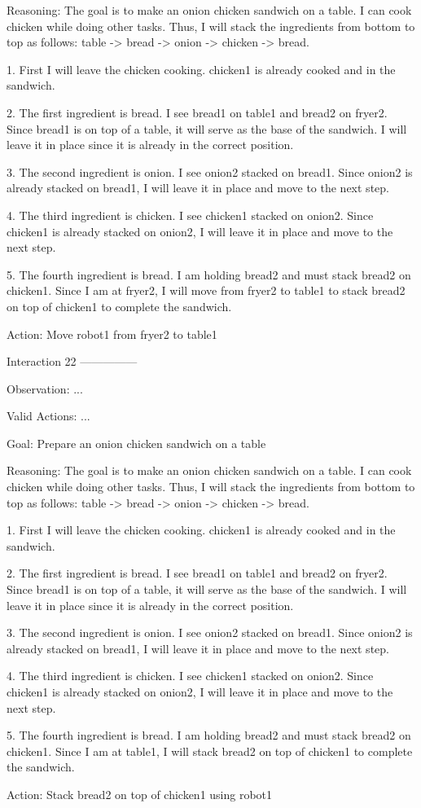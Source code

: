 Reasoning: The goal is to make an onion chicken sandwich on a table. I can cook chicken while doing other tasks. Thus, I
will stack the ingredients from bottom to top as follows: table -> bread -> onion -> chicken -> bread.

1. First I will leave the chicken cooking. chicken1 is already cooked and in the sandwich.

2. The first ingredient is bread. I see bread1 on table1 and bread2 on fryer2. Since bread1 is on top of a table, it will serve as the base of the sandwich. I will leave it in place since it is already in the correct position.

3. The second ingredient is onion. I see onion2 stacked on bread1. Since onion2 is already stacked on bread1, I will leave it in place and move to the next step.

4. The third ingredient is chicken. I see chicken1 stacked on onion2. Since chicken1 is already stacked on onion2, I will leave it in place and move to the next step.

5. The fourth ingredient is bread. I am holding bread2 and must stack bread2 on chicken1. Since I am at fryer2, I will move from fryer2 to table1 to stack bread2 on top of chicken1 to complete the sandwich.

Action: Move robot1 from fryer2 to table1


Interaction 22
---------------


Observation: ...

Valid Actions: ...

Goal: Prepare an onion chicken sandwich on a table


Reasoning: The goal is to make an onion chicken sandwich on a table. I can cook chicken while doing other tasks. Thus, I
will stack the ingredients from bottom to top as follows: table -> bread -> onion -> chicken -> bread.

1. First I will leave the chicken cooking. chicken1 is already cooked and in the sandwich.

2. The first ingredient is bread. I see bread1 on table1 and bread2 on fryer2. Since bread1 is on top of a table, it will serve as the base of the sandwich. I will leave it in place since it is already in the correct position.

3. The second ingredient is onion. I see onion2 stacked on bread1. Since onion2 is already stacked on bread1, I will leave it in place and move to the next step.

4. The third ingredient is chicken. I see chicken1 stacked on onion2. Since chicken1 is already stacked on onion2, I will leave it in place and move to the next step.

5. The fourth ingredient is bread. I am holding bread2 and must stack bread2 on chicken1. Since I am at table1, I will stack bread2 on top of chicken1 to complete the sandwich.

Action: Stack bread2 on top of chicken1 using robot1
